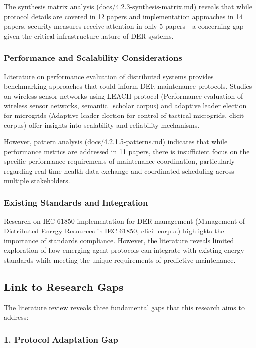 The synthesis matrix analysis (docs/4.2.3-synthesis-matrix.md) reveals that while protocol details are covered in 12 papers and implementation approaches in 14 papers, security measures receive attention in only 5 papers—a concerning gap given the critical infrastructure nature of DER systems.

\subsubsection{Performance and Scalability Considerations}

Literature on performance evaluation of distributed systems provides benchmarking approaches that could inform DER maintenance protocols. Studies on wireless sensor networks using LEACH protocol (Performance evaluation of wireless sensor networks, semantic_scholar corpus) and adaptive leader election for microgrids (Adaptive leader election for control of tactical microgrids, elicit corpus) offer insights into scalability and reliability mechanisms.

However, pattern analysis (docs/4.2.1.5-patterns.md) indicates that while performance metrics are addressed in 11 papers, there is insufficient focus on the specific performance requirements of maintenance coordination, particularly regarding real-time health data exchange and coordinated scheduling across multiple stakeholders.

\subsubsection{Existing Standards and Integration}

Research on IEC 61850 implementation for DER management (Management of Distributed Energy Resources in IEC 61850, elicit corpus) highlights the importance of standards compliance. However, the literature reveals limited exploration of how emerging agent protocols can integrate with existing energy standards while meeting the unique requirements of predictive maintenance.

\subsection{Link to Research Gaps}

The literature review reveals three fundamental gaps that this research aims to address:

\subsubsection{1. Protocol Adaptation Gap}

